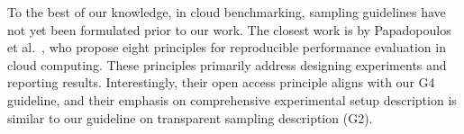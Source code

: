 To the best of our knowledge, in cloud benchmarking, sampling guidelines have not yet been formulated prior to our work. The closest work is by Papadopoulos et al.~\cite{papadopoulosMethodologicalPrinciplesReproducible2019}, who propose eight principles for reproducible performance evaluation in cloud computing. These principles primarily address designing experiments and reporting results. Interestingly, their open access principle aligns with our G4 guideline, and their emphasis on comprehensive experimental setup description is similar to our guideline on transparent sampling description (G2).